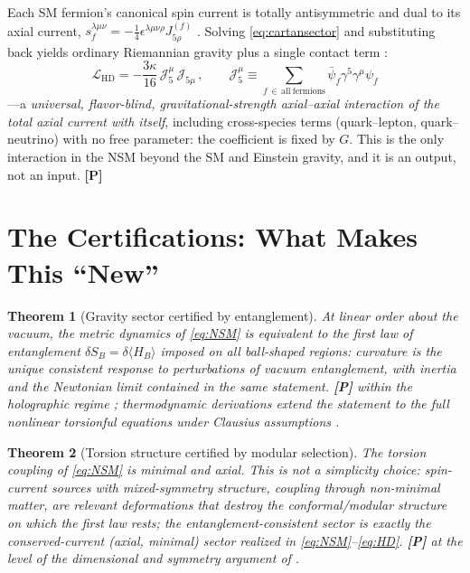 \documentclass[11pt]{article}
\newtheorem{theorem}{Theorem}[section]
\theoremstyle{definition}
\newcommand{\pP}{\textbf{[P]}}
\begin{document}
Each SM fermion's canonical spin current is totally antisymmetric and dual
to its axial current, $s_f^{\lambda\mu\nu}=
-\tfrac14\epsilon^{\lambda\mu\nu\rho}J_{5\rho}^{(f)}$
\cite{HehlDatta1971,McGwier2026b}. Solving \eqref{eq:cartansector} and
substituting back yields ordinary Riemannian gravity plus a single
contact term \cite{HehlDatta1971}:
\begin{equation}
\boxed{\;
\mathcal{L}_{\mathrm{HD}}
=-\frac{3\kappa}{16}\,
\mathcal{J}_5^{\mu}\,\mathcal{J}_{5\mu}\,,
\qquad
\mathcal{J}_5^\mu\equiv\sum_{f\,\in\,\mathrm{all\ fermions}}
\bar\psi_f\gamma^5\gamma^\mu\psi_f\;}
\label{eq:HD}
\end{equation}
---a \emph{universal, flavor-blind, gravitational-strength axial--axial
interaction of the total axial current with itself}, including
cross-species terms (quark--lepton, quark--neutrino) with no free
parameter: the coefficient is fixed by $G$. This is the only interaction
in the NSM beyond the SM and Einstein gravity, and it is an output, not an
input. \pP{}

\section{The Certifications: What Makes This ``New''}

\begin{theorem}[Gravity sector certified by entanglement]
At linear order about the vacuum, the metric dynamics of \eqref{eq:NSM} is
equivalent to the first law of entanglement
$\delta S_B=\delta\langle H_B\rangle$ imposed on all ball-shaped regions:
curvature is the unique consistent response to perturbations of vacuum
entanglement, with inertia and the Newtonian limit contained in the same
statement. \pP{} within the holographic regime
\cite{Faulkner2014,Lashkari2014,McGwier2026a}; thermodynamic derivations
extend the statement to the full nonlinear torsionful equations under
Clausius assumptions \cite{Jacobson1995,DLP2017,JacobsonMohd2015}.
\end{theorem}

\begin{theorem}[Torsion structure certified by modular selection]
The torsion coupling of \eqref{eq:NSM} is minimal and axial. This is not a
simplicity choice: spin-current sources with mixed-symmetry structure,
coupling through non-minimal matter, are relevant deformations that
destroy the conformal/modular structure on which the first law rests; the
entanglement-consistent sector is exactly the conserved-current (axial,
minimal) sector realized in \eqref{eq:NSM}--\eqref{eq:HD}. \pP{} at the
level of the dimensional and symmetry argument of \cite{McGwier2026b}.
\end{theorem}
\end{document}
